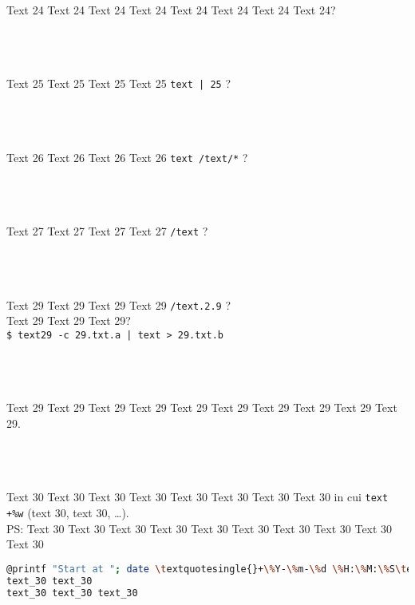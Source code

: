 \documentclass[9pt]{exam}
\begin{document}
\begin{questions}
\question
    Text 24 Text 24 Text 24 Text 24 Text 24 Text 24 Text 24 Text 24?\\\\
    \makebox[0.9\textwidth]{\$ \enspace\hrulefill}\\\\
    \makebox[0.9\textwidth]{\enspace\hrulefill}

\question
    Text 25 Text 25 Text 25 Text 25 \textquotesingle{}\texttt{text | 25}\textquotesingle{} ?\\\\
    \makebox[0.9\textwidth]{\$ \enspace\hrulefill}\\\\
    \makebox[0.9\textwidth]{\enspace\hrulefill}

\question
    Text 26 Text 26 Text 26 Text 26 \textquotesingle{}\texttt{text /text/*}\textquotesingle{} ?\\\\
    \makebox[0.9\textwidth]{\$ \enspace\hrulefill}\\\\
    \makebox[0.9\textwidth]{\enspace\hrulefill}

\question
    Text 27 Text 27 Text 27 Text 27 \texttt{/text} ?\\\\
    \makebox[0.9\textwidth]{\$ \enspace\hrulefill}\\\\
    \makebox[0.9\textwidth]{\enspace\hrulefill}

\question
    Text 29 Text 29 Text 29 Text 29 \texttt{/text.2.9} ?\\
    Text 29 Text 29 Text 29?\\
    \makebox[0.05\textwidth]{}
    \texttt{\$ text29 -c 29.txt.a | text > 29.txt.b}\\\\
    \makebox[0.9\textwidth]{\$ \enspace\hrulefill}\\\\
    \makebox[0.9\textwidth]{\enspace\hrulefill}

\question
    Text 29 Text 29 Text 29 Text 29 Text 29 Text 29 Text 29 Text 29 
    Text 29 Text 29.\\\\
    \makebox[0.9\textwidth]{\$ \enspace\hrulefill}\\\\
    \makebox[0.9\textwidth]{\enspace\hrulefill}

\question
    Text 30 Text 30 Text 30 Text 30 Text 30 Text 30 Text 30 Text 30 
    in cui \textquotedbl{}\texttt{text \textquotesingle{}+\%w\textquotesingle{}}\textquotedbl{}
    (text $30$, text $30$, \dots{}).\\
    PS: Text 30 Text 30 Text 30 Text 30 Text 30
        Text 30 Text 30 Text 30 Text 30 Text 30
\begin{lstlisting}[language=Bash, caption=Text 30 Text 30 Text 30 Text 30 Text 30]
@printf "Start at "; date \textquotesingle{}+\%Y-\%m-\%d \%H:\%M:\%S\textquotesingle{}@
text_30 text_30 
text_30 text_30 text_30


\end{lstlisting}
\end{questions}
\end{document}

